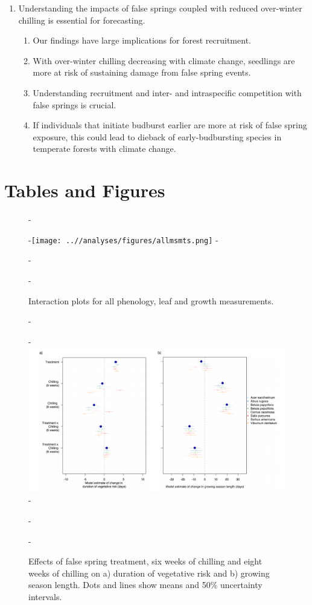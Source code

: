 \documentclass{article}\usepackage[]{graphicx}\usepackage[]{color}
\begin{document}
\begin{enumerate}
\item Understanding the impacts of false springs coupled with reduced over-winter chilling is essential for forecasting.
  \begin{enumerate}
  \item Our findings have large implications for forest recruitment.
  \item With over-winter chilling decreasing with climate change, seedlings are more at risk of sustaining damage from false spring events. 
  \item Understanding recruitment and inter- and intraspecific competition with false springs is crucial. 
  \item If individuals that initiate budburst earlier are more at risk of false spring exposure, this could lead to dieback of early-budbursting species in temperate forests with climate change.
  \end{enumerate}
\end{enumerate}






\section*{Tables and Figures}
  {\begin{figure} [H]
  -\begin{center}
  -\texttt{[image: ..//analyses/figures/allmsmts.png]} 
  -\caption{Interaction plots for all phenology, leaf and growth measurements. }\label{fig:intrxns}
  -\end{center}
  -\end{figure}}
  
  {\begin{figure} [H]
  -\begin{center}
  -\includegraphics[width=18cm]{..//analyses/figures/mu_phen.pdf} 
  -\caption{Effects of false spring treatment, six weeks of chilling and eight weeks of chilling on a) duration of vegetative risk and b) growing season length. Dots and lines show means and 50\% uncertainty intervals.}\label{fig:muphen}
  -\end{center}
  -\end{figure}}
  
\end{document}
